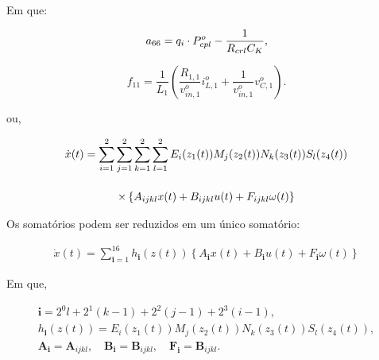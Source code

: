 Em que:

\begin{equation*}
    a_{66} = \displaystyle q_i \cdot P_{cpl}^o - \frac{1}{R_{crl} C_K},
\end{equation*} 

\begin{equation*}
    f_{11} = \frac{1}{L_1} \left( \frac{R_{1,1}}{v_{in,1}^o}i_{L,1}^o + \frac{1}{v_{in,1}^o}v_{C,1}^o \right).
\end{equation*}

ou, 

\begin{gather}
    \dot{x}(t) =
  \sum\limits_{i=1}^{2} \sum\limits_{j=1}^{2} \sum\limits_{k=1}^{2} \sum\limits_{l=1}^{2} E_i(z_1(t))M_j(z_2(t))N_k(z_3(t))S_l(z_4(t))
  \notag \\[12pt] \times
  \left\{
    A_{ijkl}x(t) + B_{ijkl}u(t) + F_{ijkl}\omega(t)
  \right\}
\end{gather}

Os somatórios podem ser reduzidos em um único somatório:

\begin{gather}
    \dot{x}(t) =
  \sum\limits_{\mathbf{i}=1}^{16} h_{\mathbf{i}}(z(t))\left\{ A_{\mathbf{i}}x(t) + B_{\mathbf{i}}u(t) + F_{\mathbf{i}}\omega(t)\right\}
\end{gather}

Em que,


\begin{gather*}
    \mathbf{i}=2^0l+2^1(k-1)+2^2(j-1)+2^3(i-1), \\
    h_\mathbf{i}(z(t))=E_i\left(z_1(t)\right) M_j\left(z_2(t)\right) N_k\left(z_3(t)\right) S_l\left(z_4(t)\right), \\
    \boldsymbol{A}_\mathbf{i}=\boldsymbol{A}_{i j k l}, \quad \boldsymbol{B}_\mathbf{i}=\boldsymbol{B}_{i j k l}, \quad \boldsymbol{F}_\mathbf{i}=\boldsymbol{B}_{i j k l} .
\end{gather*}